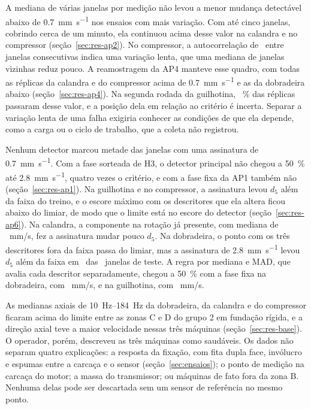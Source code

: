 A mediana de várias janelas por medição não levou a menor mudança detectável abaixo de \SI{0,7}{\milli\meter\per\second} nos ensaios com mais variação. Com até cinco janelas, cobrindo cerca de um minuto, ela continuou acima desse valor na calandra e no compressor (seção~\ref{sec:res-ap2}). No compressor, a autocorrelação de \apDoisAutocorrCompressorUm\ entre janelas consecutivas indica uma variação lenta, que uma mediana de janelas vizinhas reduz pouco. A reamostragem da AP4 manteve esse quadro, com todas as réplicas da calandra e do compressor acima de \SI{0,7}{\milli\meter\per\second} e as da dobradeira abaixo (seção~\ref{sec:res-ap4}). Na segunda rodada da guilhotina, \apQuatroAcimaGuilhotinaDois~\% das réplicas passaram desse valor, e a posição dela em relação ao critério é incerta. Separar a variação lenta de uma falha exigiria conhecer as condições de que ela depende, como a carga ou o ciclo de trabalho, que a coleta não registrou.

Nenhum detector marcou metade das janelas com uma assinatura de \SI{0,7}{\milli\meter\per\second}. Com a fase sorteada de H3, o detector principal não chegou a \SI{50}{\percent} até \SI{2,8}{\milli\meter\per\second}, quatro vezes o critério, e com a fase fixa da AP1 também não (seção~\ref{sec:res-ap1}). Na guilhotina e no compressor, a assinatura levou $d_5$ além da faixa do treino, e o escore máximo com os descritores que ela altera ficou abaixo do limiar, de modo que o limite está no escore do detector (seção~\ref{sec:res-ap6}). Na calandra, a componente na rotação já presente, com mediana de \hTresBaseUmXCalandra~mm/s, fez a assinatura mudar pouco $d_5$. Na dobradeira, o ponto com os três descritores fora da faixa passa do limiar, mas a assinatura de \SI{2,8}{\milli\meter\per\second} levou $d_5$ além da faixa em \apSeisJanelasDcincoAcimaDobradeira\ das \hTresTesteDobradeira\ janelas de teste. A regra por mediana e MAD, que avalia cada descritor separadamente, chegou a \SI{50}{\percent} com a fase fixa na dobradeira, com \apUmMadAcinquentaZeroDobradeira~mm/s, e na guilhotina, com \apUmMadAcinquentaZeroGuilhotina~mm/s.

As medianas axiais de \SIrange{10}{184}{\hertz} da dobradeira, da calandra e do compressor ficaram acima do limite entre as zonas C e D do grupo 2 em fundação rígida, e a direção axial teve a maior velocidade nessas três máquinas (seção~\ref{sec:res-base}). O operador, porém, descreveu as três máquinas como saudáveis. Os dados não separam quatro explicações: a resposta da fixação, com fita dupla face, invólucro e espumas entre a carcaça e o sensor (seção~\ref{sec:ensaios}); o ponto de medição na carcaça do motor; a massa do transmissor; ou máquinas de fato fora da zona B. Nenhuma delas pode ser descartada sem um sensor de referência no mesmo ponto.

